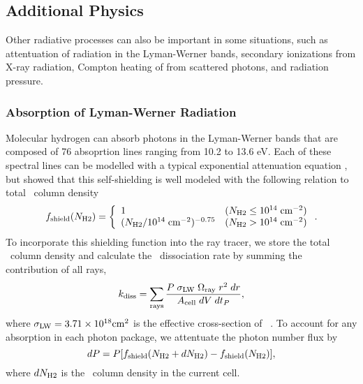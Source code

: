 \documentclass[12pt,preprint]{aastex}
\begin{document}
\subsection{Additional Physics}
\label{sec:addphysics}

Other radiative processes can also be important in some situations,
such as attentuation of radiation in the Lyman-Werner bands, secondary
ionizations from X-ray radiation, Compton heating of from scattered
photons, and radiation pressure.

\subsubsection{Absorption of Lyman-Werner Radiation}

Molecular hydrogen can absorb photons in the Lyman-Werner bands that
are composed of 76 absoprtion lines ranging from 10.2 to 13.6 eV.
Each of these spectral lines can be modelled with a typical
exponential attenuation equation \citep{Ricotti01}, but
\citet{Draine96} showed that this self-shielding is well modeled with
the following relation to total \hh~column density
%
\begin{equation}
  \label{eqn:lwband}
  f_{\rm shield}(N_{\rm H2}) = \left\{ \begin{array}{l@{\quad}l}
      1 & (N_{\rm H2} \le 10^{14} \; \mathrm{cm}^{-2})\\
      (N_{\rm H2}/10^{14} \; \mathrm{cm}^{-2})^{-0.75} & (N_{\rm H2} >
        10^{14} \; \mathrm{cm}^{-2})
    \end{array} \right. .
\end{equation}
To incorporate this shielding function into the ray tracer, we store
the total \hh~column density and calculate the \hh~dissociation rate
by summing the contribution of all rays,
%
\begin{equation}
  \label{eqn:lwRT}
  k_{\rm diss} = \sum_{\rm rays} \frac{P \; \sigma_{\rm LW} \;
    \Omega_{\rm ray} \; r^2 \; dr}{A_{\rm cell} \; dV \; dt_P},
\end{equation}
where $\sigma_{\rm LW} = 3.71 \times 10^{18} \mathrm{cm}^2$ is the
effective cross-section of \hh~\citep{Abel97}.  To account for any
absorption in each photon package, we attentuate the photon number
flux by
%
\begin{equation}
  \label{eqn:LWdP}
  dP = P [f_{\rm shield}(N_{\rm H2} + dN_{\rm H2}) - f_{\rm shield}(N_{\rm H2})],
\end{equation}
where $dN_{\rm H2}$ is the \hh~column density in the current cell.
\end{document}
